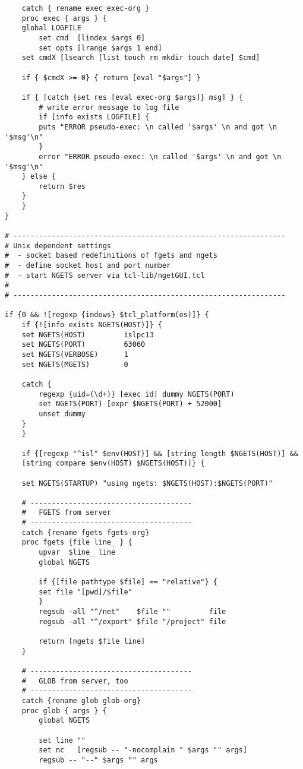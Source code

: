 {\begin{verbatim}
    catch { rename exec exec-org }
    proc exec { args } {
	global LOGFILE
        set cmd  [lindex $args 0]
        set opts [lrange $args 1 end]
	set cmdX [lsearch [list touch rm mkdir touch date] $cmd]

	if { $cmdX >= 0} { return [eval "$args"] }

	if { [catch {set res [eval exec-org $args]} msg] } {
	    # write error message to log file
	    if [info exists LOGFILE] {
		puts "ERROR pseudo-exec: \n called '$args' \n and got \n '$msg'\n"
	    }
	    error "ERROR pseudo-exec: \n called '$args' \n and got \n '$msg'\n"
	} else {
	    return $res
	}
    }
}

# ----------------------------------------------------------------
# Unix dependent settings
#  - socket based redefinitions of fgets and ngets 
#  - define socket host and port number
#  - start NGETS server via tcl-lib/ngetGUI.tcl 
#
# ----------------------------------------------------------------

if {0 && ![regexp {indows} $tcl_platform(os)]} {
    if {![info exists NGETS(HOST)]} {
	set NGETS(HOST)         islpc13
	set NGETS(PORT)         63060	
	set NGETS(VERBOSE)      1
	set NGETS(MGETS)        0
	
	catch {
	    regexp {uid=(\d+)} [exec id] dummy NGETS(PORT)
	    set NGETS(PORT) [expr $NGETS(PORT) + 52000]
	    unset dummy
	}
    }

    if {[regexp "^isl" $env(HOST)] && [string length $NGETS(HOST)] &&
	[string compare $env(HOST) $NGETS(HOST)]} {

	set NGETS(STARTUP) "using ngets: $NGETS(HOST):$NGETS(PORT)"

	# --------------------------------------
	#   FGETS from server
	# --------------------------------------
	catch {rename fgets fgets-org}
	proc fgets {file line_ } {
	    upvar  $line_ line
	    global NGETS
	    
	    if {[file pathtype $file] == "relative"} {
		set file "[pwd]/$file"
	    }
	    regsub -all "^/net"    $file ""         file
	    regsub -all "^/export" $file "/project" file
	    
	    return [ngets $file line]
	}
	
	# --------------------------------------
	#   GLOB from server, too
	# --------------------------------------
	catch {rename glob glob-org}
	proc glob { args } {
	    global NGETS
	    
	    set line ""
	    set nc   [regsub -- "-nocomplain " $args "" args]
	    regsub -- "--" $args "" args
	    

\end{verbatim}}
